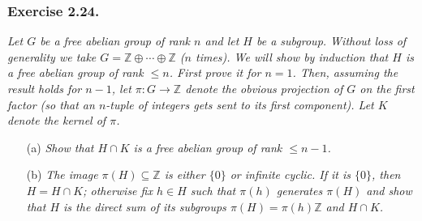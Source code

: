 \documentclass{article}
\begin{document}
\subsubsection*{Exercise 2.24.}
\emph{Let $G$ be a free abelian group of rank $n$ and let $H$ be a subgroup.
Without loss of generality we take $G = \mathbb{Z} \oplus \cdots \oplus \mathbb{Z}$ ($n$ times).
We will show by induction that $H$ is a free abelian group of rank $\leq n$.
First prove it for $n = 1$. Then, assuming the result holds for $n-1$,
let $\pi: G \to \mathbb{Z}$ denote the obvious projection of $G$ on the first factor
(so that an $n$-tuple of integers gets sent to its first component).
Let $K$ denote the kernel of $\pi$.}
\begin{enumerate}
\item[(a)]
  \emph{Show that $H \cap K$ is a free abelian group of rank $\leq n-1$.}

\item[(b)]
  \emph{The image $\pi(H) \subseteq \mathbb{Z}$ is
  either $\{ 0 \}$ or infinite cyclic.
  If it is $\{ 0 \}$, then $H = H \cap K$;
  otherwise fix $h \in H$ such that $\pi(h)$ generates $\pi(H)$ and show that
  $H$ is the direct sum of its subgroups $\pi(H) = \pi(h)\mathbb{Z}$ and $H \cap K$.} \\
\end{enumerate}
\end{document}
